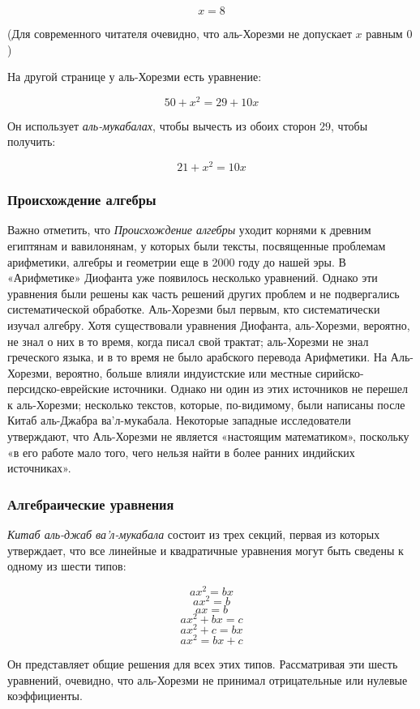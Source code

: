 $$x = 8$$

(Для современного читателя очевидно, что аль-Хорезми не допускает $x$
равным $0$)

На другой странице у аль-Хорезми есть уравнение:

$$50 + x^2 = 29 + 10x$$

Он использует \textit{аль-мукабалах}, чтобы вычесть из обоих сторон $29$, чтобы получить:

$$21 + x^2 = 10x$$

\subsubsection{Происхождение алгебры}
Важно отметить, что \textit{Происхождение алгебры} уходит корнями к древним египтянам и вавилонянам, у которых были тексты, посвященные проблемам арифметики, алгебры и геометрии еще в 2000 году до нашей эры. В «Арифметике» Диофанта уже появилось несколько уравнений. Однако эти уравнения были решены как часть решений других проблем и не подвергались систематической обработке. Аль-Хорезми был первым, кто систематически изучал алгебру. Хотя существовали уравнения Диофанта, аль-Хорезми, вероятно, не знал о них в то время, когда писал свой трактат; аль-Хорезми не знал греческого языка, и в то время не было арабского перевода Арифметики. На Аль-Хорезми, вероятно, больше влияли индуистские или местные сирийско-персидско-еврейские источники. Однако ни один из этих источников не перешел к аль-Хорезми; несколько текстов, которые, по-видимому, были написаны после Китаб аль-Джабра ва'л-мукабала. Некоторые западные исследователи утверждают, что Аль-Хорезми не является «настоящим математиком», поскольку «в его работе мало того, чего нельзя найти в более ранних индийских источниках».

\subsubsection{Алгебраические уравнения}
\textit{Китаб аль-джаб ва'л-мукабала} состоит из трех секций, первая из которых утверждает, что все линейные и квадратичные уравнения могут быть сведены к одному из шести типов:

$$ax^2 = bx$$
$$ax^2 = b$$
$$ax = b$$
$$ax^2 + bx = c$$
$$ax^2 + c = bx$$
$$ax^2 = bx + c$$

Он представляет общие решения для всех этих типов. Рассматривая эти шесть уравнений, очевидно, что аль-Хорезми не принимал отрицательные или нулевые коэффициенты.

